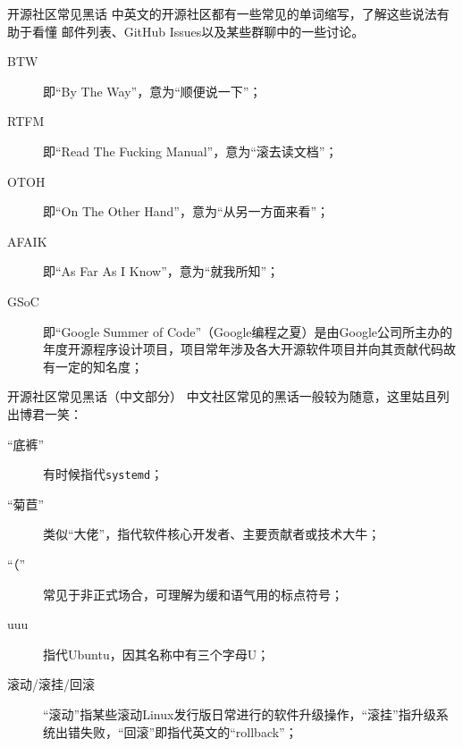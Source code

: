 \begin{frame}{开源社区常见黑话}
	中英文的开源社区都有一些常见的单词缩写，了解这些说法有助于看懂
	邮件列表、GitHub Issues以及某些群聊中的一些讨论。
	\vfill
	\begin{description}
		\item[BTW] 即“By The Way”，意为“顺便说一下”；
		\item[RTFM] 即“Read The Fucking Manual”，意为“滚去读文档”；
		\item[OTOH] 即“On The Other Hand”，意为“从另一方面来看”；
		\item[AFAIK] 即“As Far As I Know”，意为“就我所知”；
		\item[GSoC] 即“Google Summer of Code”（Google编程之夏）是由Google公司所主办的年度开源程序设计项目，项目常年涉及各大开源软件项目并向其贡献代码故有一定的知名度；
		
		
	\end{description}
\end{frame}

\begin{frame}{开源社区常见黑话（中文部分）}
	中文社区常见的黑话一般较为随意，这里姑且列出博君一笑：
	\vfill
	\begin{description}
		\item[“底裤”] 有时候指代\texttt{systemd}；
		\item[“菊苣”] 类似“大佬”，指代软件核心开发者、主要贡献者或技术大牛；
		\item[“（”] 常见于非正式场合，可理解为缓和语气用的标点符号；
		\item[uuu] 指代Ubuntu，因其名称中有三个字母U；
		\item[滚动/滚挂/回滚] “滚动”指某些滚动Linux发行版日常进行的软件升级操作，“滚挂”指升级系统出错失败，“回滚”即指代英文的“rollback”；
		
	\end{description}
\end{frame}